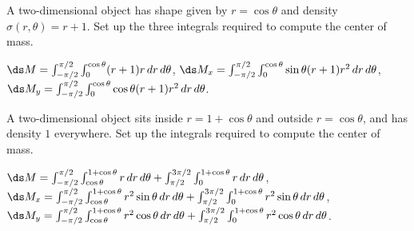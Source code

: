 \begin{exercises}
\begin{exercise} A two-dimensional object has shape given by 
$r=\cos\theta$ and density $\sigma(r,\theta)=r+1$. Set up
the three integrals required to compute the center of mass.
\begin{answer} $\ds M=\int_{-\pi/2}^{\pi/2} \int_0^{\cos\theta} (r+1)r\,dr\,d\theta$,
\hfill\break
$\ds M_x=\int_{-\pi/2}^{\pi/2} \int_0^{\cos\theta} \sin\theta(r+1)r^2\,dr\,d\theta$,
\hfill\break
$\ds M_y=\int_{-\pi/2}^{\pi/2} \int_0^{\cos\theta} \cos\theta(r+1)r^2\,dr\,d\theta$.
\end{answer}\end{exercise}

\begin{exercise} A two-dimensional object sits inside $r=1+\cos\theta$
and outside $r=\cos\theta$, and has density $1$ everywhere.
Set up
the integrals required to compute the center of mass.
\begin{answer} $\ds M= \int_{-\pi/2}^{\pi/2}\int_{\cos\theta}^{1+\cos\theta}
r\,dr\,d\theta + \int_{\pi/2}^{3\pi/2}\int_0^{1+\cos\theta}r\,dr\,d\theta$,
\hfill\break
$\ds M_x=\int_{-\pi/2}^{\pi/2}\int_{\cos\theta}^{1+\cos\theta}
r^2\sin\theta\,dr\,d\theta + \int_{\pi/2}^{3\pi/2}\int_0^{1+\cos\theta}r^2\sin\theta\,dr\,d\theta$,
\hfill\break
$\ds M_y=\int_{-\pi/2}^{\pi/2}\int_{\cos\theta}^{1+\cos\theta}
r^2\cos\theta\,dr\,d\theta + \int_{\pi/2}^{3\pi/2}\int_0^{1+\cos\theta}r^2\cos\theta\,dr\,d\theta$.
\end{answer}\end{exercise}

\end{exercises}
